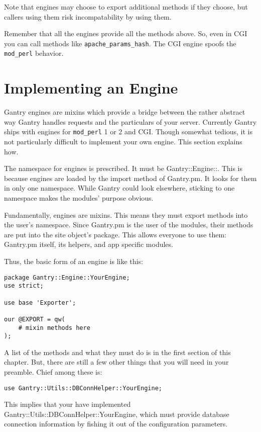 Note that engines may choose to export additional methods if they choose, but
callers using them risk incompatability by using them.

Remember that all the engines provide all the methods above.  So, even
in CGI you can call methods like \verb+apache_params_hash+.  The CGI
engine spoofs the \verb+mod_perl+ behavior.

\section{Implementing an Engine}

Gantry engines are mixins which provide a bridge between the rather abstract
way Gantry handles requests and the particulars of your server.  Currently
Gantry ships with engines for \verb+mod_perl+ 1 or 2 and CGI.  Though somewhat
tedious, it is not particularly difficult to implement your own engine.
This section explains how.

The namespace for engines is prescribed.  It must be Gantry::Engine::.
This is because engines are loaded by the import method of Gantry.pm.  It
looks for them in only one namespace.  While Gantry could look elsewhere,
sticking to one namespace makes the modules' purpose obvious.

Fundamentally, engines are mixins.  This means they must export methods into
the user's namespace.  Since Gantry.pm is the user of the modules, their
methods are put into the site object's package.  This allows everyone
to use them: Gantry.pm itself, its helpers, and app specific modules.

Thus, the basic form of an engine is like this:

\begin{verbatim}
package Gantry::Engine::YourEngine;
use strict;

use base 'Exporter';

our @EXPORT = qw(
    # mixin methods here
);
\end{verbatim}

A list of the methods and what they must do is in the first section of
this chapter.  But, there are still a few other things that you will need
in your preamble.  Chief among these is:

\begin{verbatim}
use Gantry::Utils::DBConnHelper::YourEngine;
\end{verbatim}

This implies that your have implemented
Gantry::Utils::DBConnHelper::YourEngine, which must provide database
connection information by fishing it out of the configuration parameters.

